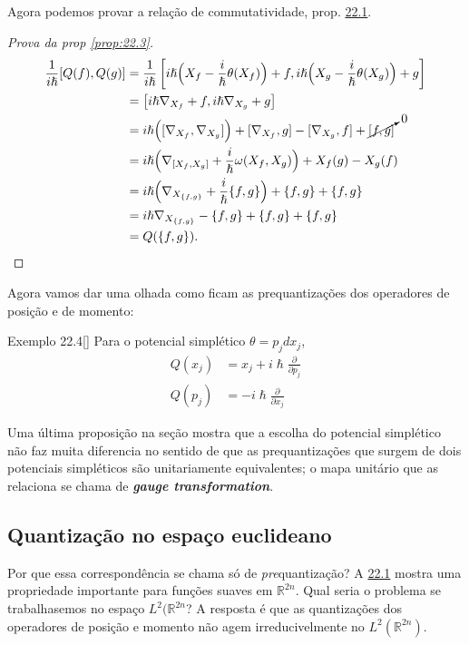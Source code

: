 Agora podemos provar a relação de commutatividade, prop. \hyperref[prop:22.1]{22.1}.

\begin{proof}[Prova da prop \cref{prop:22.3}]\leavevmode
\begin{align*}
	\frac{1}{i\hslash}[Q(f),Q(g)]&=\frac{1}{i\hslash}\left[  i\hslash \Big(X_f-\frac{i}{\hslash}\theta(X_f)\Big)+f,i\hslash \Big(X_g-\frac{i}{\hslash}\theta(X_g)\Big)+g\right]\\
&=\left[i\hslash \nabla_{X_f}+f,i\hslash\nabla_{X_g}+g \right] \\
&=i\hslash\Big([\nabla_{X_f},\nabla_{X_g}]\Big)+[\nabla_{X_f},g]-[\nabla_{X_g},f]+\cancelto{0}{[f,g]}\\
&=i\hslash\Big(\nabla_{[X_f,X_g]}+\frac{i}{\hslash}\omega(X_f,X_g)\Big)+X_f(g)-X_g(f)\\
&=i\hslash\Big(\nabla_{X_{\{f,g\}}}+\frac{i}{\hslash}\{f,g\}\Big)+\{f,g\}+\{f,g\}\\
&=i\hslash \nabla_{X_{\{f,g\}}}-\{f,g\}+\{f,g\}+\{f,g\}\\
&=Q(\{f,g\}).
\end{align*}
\end{proof}

Agora vamos dar uma olhada como ficam as prequantizações dos operadores de posição e de momento:

\begin{thing4}{Exemplo 22.4}[\cite{hallq}]\leavevmode
	Para o potencial simplético $\theta=p_jdx_j$,
	\begin{align*}
	Q(x_j)&=x_j+i\hslash\frac{\partial }{\partial p_j}\\
	Q(p_j)&=-i\hslash\frac{\partial }{\partial x_j}
	\end{align*}
\end{thing4}

Uma última proposição na seção mostra que a escolha do potencial simplético não faz muita diferencia no sentido de que as prequantizações que surgem de dois potenciais simpléticos são unitariamente equivalentes; o mapa unitário que as relaciona se chama de \textit{\textbf{gauge transformation}}.

\subsection{Quantização no espaço euclideano}

Por que essa correspondência se chama só de \textit{pre}quantização? A \hyperref[prop:22.1]{22.1} mostra uma propriedade importante para funções suaves em $\mathbb{R}^{2n}$. Qual seria o problema se trabalhasemos no espaço $L^2(\mathbb{R}^{2n}$? A resposta é que as quantizações dos operadores de posição e momento não  agem irreducivelmente no $L^2(\mathbb{R}^{2n})$. 

